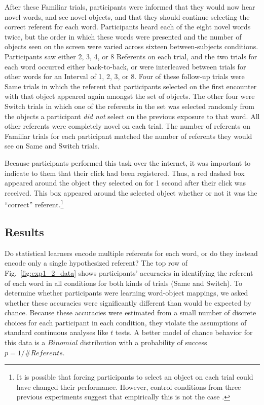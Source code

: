 \documentclass[man,floatsintext]{apa6}
\begin{document}
After these Familiar trials, participants were informed that they would now hear novel words, and see novel objects, and that they should continue selecting the correct referent for each word. Participants heard each of the eight novel words twice, but the order in which these words were presented and the number of objects seen on the screen were varied across sixteen between-subjects conditions. Participants saw either 2, 3, 4, or 8 Referents on each trial, and the two trials for each word occurred either back-to-back, or were interleaved between trials for other words for an Interval of 1, 2, 3, or 8. Four of these follow-up trials were Same trials in which the referent that participants selected on the first encounter with that object appeared again amongst the set of objects. The other four were Switch trials in which one of the referents in the set was selected randomly from the objects a participant \emph{did not} select on the previous exposure to that word. All other referents were completely novel on each trial. The number of referents on Familiar trials for each participant matched the number of referents they would see on Same and Switch trials.

Because participants performed this task over the internet, it was important to indicate to them that their click had been registered. Thus, a red dashed box appeared around the object they selected on for 1 second after their click was received. This box appeared around the selected object whether or not it was the ``correct'' referent.\footnote{It is possible that forcing participants to select an object on each trial could have changed their performance. However, control conditions from three previous experiments suggest that empirically this is not the case \cite{Medina2011, Smith2011a, Trueswell2013}.}

\subsection{Results}

Do statistical learners encode multiple referents for each word, or do they instead encode only a single hypothesized referent? The top row of Fig.~\ref{fig:exp1_2_data} shows participants' accuracies in identifying the referent of each word in all conditions for both kinds of trials (Same and Switch). To determine whether participants were learning word-object mappings, we asked whether these accuracies were significantly different than would be expected by chance. Because these accuracies were estimated from a small number of discrete choices for each participant in each condition, they violate the assumptions of standard continuous analyses like $t$ tests. A better model of chance behavior for this data is a $Binomial$ distribution with a probability of success $p=1/\# Referents$. 
\end{document}
